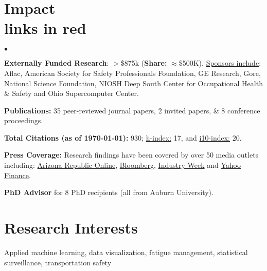 \documentclass[margin,line]{res}
\newenvironment{list2}{
  \begin{list}{$\bullet$}{%
      \setlength{\itemsep}{0in}
      \setlength{\parsep}{0in} \setlength{\parskip}{0in}
      \setlength{\topsep}{0in} \setlength{\partopsep}{0in} 
      \setlength{\leftmargin}{0.2in}}}{\end{list}}
\begin{document}
\begin{resume}
\section{\sc Impact \\ \lbrack links in \textcolor{miamired}{red}\rbrack}
\begin{list2}
	\item \textbf{Externally Funded Research}: $>$\$875k (\textbf{Share:} $\approx$\$500K). \underline{Sponsors include}: Aflac, American Society for Safety Professionals Foundation, GE Research, Gore, National Science Foundation, NIOSH Deep South Center for Occupational Health \& Safety and Ohio Supercomputer Center.
	\item \textbf{Publications:} 35 peer-reviewed journal papers, 2 invited papers, \& 8 conference proceedings.
	\item \textbf{Total Citations (as of \today):} 930; \underline{h-index:} 17, and \underline{i10-index:} 20.
	\item \textbf{Press Coverage:} Research findings have been covered by over 50 media outlets including: \href{http://finance.azcentral.com/azcentral/news/read/37528814/research_shows_value_of_wearable_technology_in_reducing_workplace_injuries}{Arizona Republic Online}, \href{https://news.bloombergenvironment.com/safety/wireless-monitoring-can-limit-injuries-but-raises-concerns}{Bloomberg}, \href{https://www.industryweek.com/talent/using-technology-measure-manufacturing-worker-fatigue}{Industry Week} and \href{https://finance.yahoo.com/news/research-shows-value-wearable-technology-161923455.html}{Yahoo Finance}.
	\item \textbf{PhD Advisor} for 8 PhD recipients (all from Auburn University).
\end{list2}


\section{\sc Research Interests}
Applied machine learning, data visualization, fatigue management, 
statistical surveillance, transportation safety



\end{resume}
\end{document}
